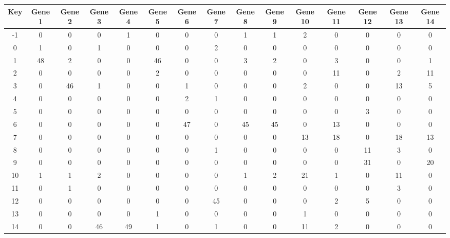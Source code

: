 \begin{tabular}{|c|c|c|c|c|c|c|c|c|c|c|c|c|c|c|}
\hline
Key & Gene 1 & Gene 2 & Gene 3 & Gene 4 & Gene 5 & Gene 6 & Gene 7 & Gene 8 & Gene 9 & Gene 10 & Gene 11 & Gene 12 & Gene 13 & Gene 14 \\
\hline
-1 & 0 & 0 & 0 & 1 & 0 & 0 & 0 & 1 & 1 & 2 & 0 & 0 & 0 & 0 \\
0 & 1 & 0 & 1 & 0 & 0 & 0 & 2 & 0 & 0 & 0 & 0 & 0 & 0 & 0 \\
1 & 48 & 2 & 0 & 0 & 46 & 0 & 0 & 3 & 2 & 0 & 3 & 0 & 0 & 1 \\
2 & 0 & 0 & 0 & 0 & 2 & 0 & 0 & 0 & 0 & 0 & 11 & 0 & 2 & 11 \\
3 & 0 & 46 & 1 & 0 & 0 & 1 & 0 & 0 & 0 & 2 & 0 & 0 & 13 & 5 \\
4 & 0 & 0 & 0 & 0 & 0 & 2 & 1 & 0 & 0 & 0 & 0 & 0 & 0 & 0 \\
5 & 0 & 0 & 0 & 0 & 0 & 0 & 0 & 0 & 0 & 0 & 0 & 3 & 0 & 0 \\
6 & 0 & 0 & 0 & 0 & 0 & 47 & 0 & 45 & 45 & 0 & 13 & 0 & 0 & 0 \\
7 & 0 & 0 & 0 & 0 & 0 & 0 & 0 & 0 & 0 & 13 & 18 & 0 & 18 & 13 \\
8 & 0 & 0 & 0 & 0 & 0 & 0 & 1 & 0 & 0 & 0 & 0 & 11 & 3 & 0 \\
9 & 0 & 0 & 0 & 0 & 0 & 0 & 0 & 0 & 0 & 0 & 0 & 31 & 0 & 20 \\
10 & 1 & 1 & 2 & 0 & 0 & 0 & 0 & 1 & 2 & 21 & 1 & 0 & 11 & 0 \\
11 & 0 & 1 & 0 & 0 & 0 & 0 & 0 & 0 & 0 & 0 & 0 & 0 & 3 & 0 \\
12 & 0 & 0 & 0 & 0 & 0 & 0 & 45 & 0 & 0 & 0 & 2 & 5 & 0 & 0 \\
13 & 0 & 0 & 0 & 0 & 1 & 0 & 0 & 0 & 0 & 1 & 0 & 0 & 0 & 0 \\
14 & 0 & 0 & 46 & 49 & 1 & 0 & 1 & 0 & 0 & 11 & 2 & 0 & 0 & 0 \\
\hline
\end{tabular}